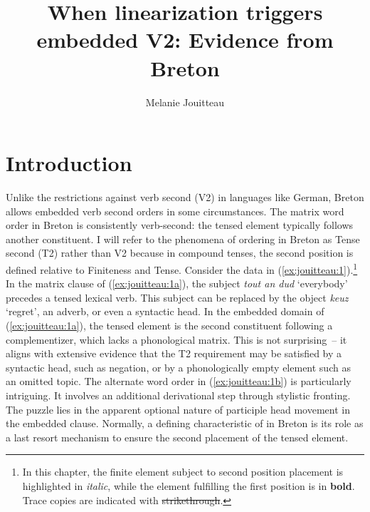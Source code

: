 \documentclass[output=paper,colorlinks,citecolor=brown]{langscibook}
\author{Melanie Jouitteau\affiliation{Centre National de la Recherche Scientifique (CNRS)}}
\title{When linearization triggers embedded V2: Evidence from Breton}
\begin{document}
\maketitle 

\section{Introduction}\label{sec:jouitteau:1}


Unlike the restrictions against verb second (V2) in languages like German, Breton allows embedded verb second orders in some circumstances. The matrix word order in Breton is consistently verb-second: the tensed element typically follows another constituent. I will refer to the phenomena of ordering in Breton as Tense second (T2) rather than V2 because in compound tenses, the second position is defined relative to Finiteness and Tense. Consider the data in (\ref{ex:jouitteau:1}).\footnote{In this chapter, the finite element subject to second position placement is highlighted in {\textit{italic}}, while the element fulfilling the first position is in \textbf{bold}. Trace copies are indicated with \sout{strikethrough}.} In the matrix clause of (\ref{ex:jouitteau:1a}), the subject \textit{tout an dud} ‘everybody’ precedes a tensed lexical verb. This subject can be replaced by the object \textit{keuz} ‘regret’, an adverb, or even a syntactic head. In the embedded domain of (\ref{ex:jouitteau:1a}), the tensed element is the second constituent following a complementizer, which lacks a phonological matrix. This is not surprising~– it aligns with extensive evidence that the T2 requirement may be satisfied by a syntactic head, such as negation, or by a phonologically empty element such as an omitted topic. The alternate word order in (\ref{ex:jouitteau:1b}) is particularly intriguing. It involves an additional derivational step through stylistic fronting. The puzzle lies in the apparent optional nature of participle head movement in the embedded clause. Normally, a defining characteristic of  in Breton is its role as a last resort mechanism to ensure the second placement of the tensed element.
\end{document}
